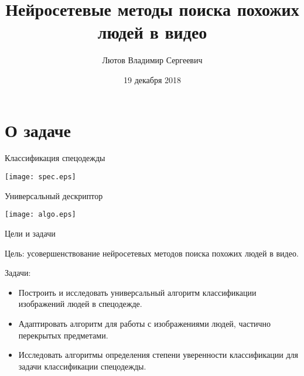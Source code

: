 \documentclass[14pt,mathserif,aspectratio=43,unicode]{beamer}
\title{Нейросетевые методы поиска похожих людей в видео}
\author{Лютов Владимир Сергеевич}
\institute{
    \small{ВМК МГУ}

    \smallskip

    \texttt{[image: lab\_logo.eps]}
}
\date{\small{19 декабря 2018}}
\begin{document}
\begin{frame}[plain]
    \titlepage
\end{frame}

\section{О задаче}

\begin{frame}{Классификация спецодежды}

    \begin{center}
        \texttt{[image: spec.eps]}
    \end{center}
    
\end{frame}


\begin{frame}{Универсальный дескриптор}

    \begin{center}
        \texttt{[image: algo.eps]}
    \end{center}
    
\end{frame}

\begin{frame}{Цели и задачи}

    Цель: усовершенствование нейросетевых методов поиска похожих людей в видео.
    
    Задачи:

    \begin{itemize}
        \item Построить и исследовать универсальный алгоритм классификации изображений людей в спецодежде.
        \item Адаптировать алгоритм для работы с изображениями людей, частично перекрытых предметами.
        \item Исследовать алгоритмы определения степени уверенности классификации для задачи классификации спецодежды.
    \end{itemize}
    
\end{frame}
\end{document}
